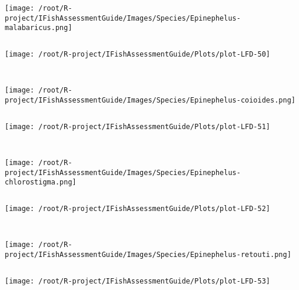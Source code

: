 \begin{knitrout}
\begin{kframe}
\begin{verbatim}
\end{verbatim}
\end{kframe}
\texttt{[image: /root/R-project/IFishAssessmentGuide/Images/Species/Epinephelus-malabaricus.png]}
\begin{kframe}\begin{verbatim}
\end{verbatim}
\end{kframe}
\texttt{[image: /root/R-project/IFishAssessmentGuide/Plots/plot-LFD-50]} 
\begin{kframe}\begin{verbatim}
 
\end{verbatim}
\end{kframe}
\texttt{[image: /root/R-project/IFishAssessmentGuide/Images/Species/Epinephelus-coioides.png]}
\begin{kframe}\begin{verbatim}
\end{verbatim}
\end{kframe}
\texttt{[image: /root/R-project/IFishAssessmentGuide/Plots/plot-LFD-51]} 
\begin{kframe}\begin{verbatim}
 
\end{verbatim}
\end{kframe}
\texttt{[image: /root/R-project/IFishAssessmentGuide/Images/Species/Epinephelus-chlorostigma.png]}
\begin{kframe}\begin{verbatim}
\end{verbatim}
\end{kframe}
\texttt{[image: /root/R-project/IFishAssessmentGuide/Plots/plot-LFD-52]} 
\begin{kframe}\begin{verbatim}
 
\end{verbatim}
\end{kframe}
\texttt{[image: /root/R-project/IFishAssessmentGuide/Images/Species/Epinephelus-retouti.png]}
\begin{kframe}\begin{verbatim}
\end{verbatim}
\end{kframe}
\texttt{[image: /root/R-project/IFishAssessmentGuide/Plots/plot-LFD-53]} 
\begin{kframe}\begin{verbatim}
 

\end{verbatim}
\end{kframe}
\end{knitrout}
